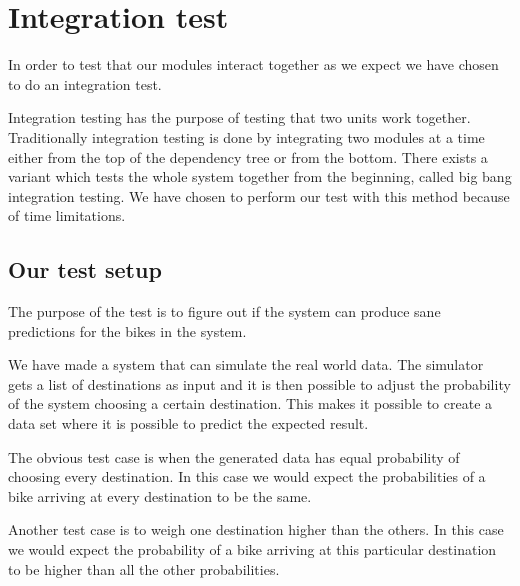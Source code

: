 \section{Integration test}

In order to test that our modules interact together as we expect we have chosen to do an integration test.

Integration testing has the purpose of testing that two units work together. 
Traditionally integration testing is done by integrating two modules at a time either from the top of the dependency tree or from the bottom.
There exists a variant which tests the whole system together from the beginning, called big bang integration testing.
We have chosen to perform our test with this method because of time limitations. \cite{inttest}

\subsection{Our test setup}
The purpose of the test is to figure out if the system can produce sane predictions for the bikes in the system.

We have made a system that can simulate the real world data. 
The simulator gets a list of destinations as input and it is then possible to adjust the probability of the system choosing a certain destination. 
This makes it possible to create a data set where it is possible to predict the expected result.

The obvious test case is when the generated data has equal probability of choosing every destination. 
In this case we would expect the probabilities of a bike arriving at every destination to be the same.

Another test case is to weigh one destination higher than the others.
In this case we would expect the probability of a bike arriving at this particular destination to be higher than all the other probabilities.